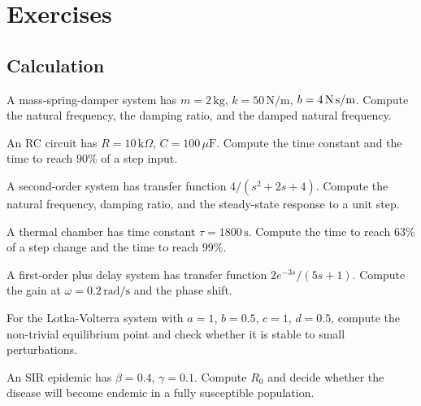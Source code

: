 \section{Exercises}

\subsection*{Calculation}

\begin{exercise}
A mass-spring-damper system has $m = 2\,\text{kg}$, $k = 50\,\text{N/m}$, $b = 4\,\text{N\,s/m}$. Compute the natural frequency, the damping ratio, and the damped natural frequency.
\end{exercise}

\begin{exercise}
An RC circuit has $R = 10\,\text{k}\Omega$, $C = 100\,\mu\text{F}$. Compute the time constant and the time to reach $90\%$ of a step input.
\end{exercise}

\begin{exercise}
A second-order system has transfer function $4/(s^2 + 2s + 4)$. Compute the natural frequency, damping ratio, and the steady-state response to a unit step.
\end{exercise}

\begin{exercise}
A thermal chamber has time constant $\tau = 1800\,\text{s}$. Compute the time to reach $63\%$ of a step change and the time to reach $99\%$.
\end{exercise}

\begin{exercise}
A first-order plus delay system has transfer function $2 e^{-3s}/(5s + 1)$. Compute the gain at $\omega = 0.2\,\text{rad/s}$ and the phase shift.
\end{exercise}

\begin{exercise}
For the Lotka-Volterra system with $a = 1$, $b = 0.5$, $c = 1$, $d = 0.5$, compute the non-trivial equilibrium point and check whether it is stable to small perturbations.
\end{exercise}

\begin{exercise}
An SIR epidemic has $\beta = 0.4$, $\gamma = 0.1$. Compute $R_0$ and decide whether the disease will become endemic in a fully susceptible population.
\end{exercise}

